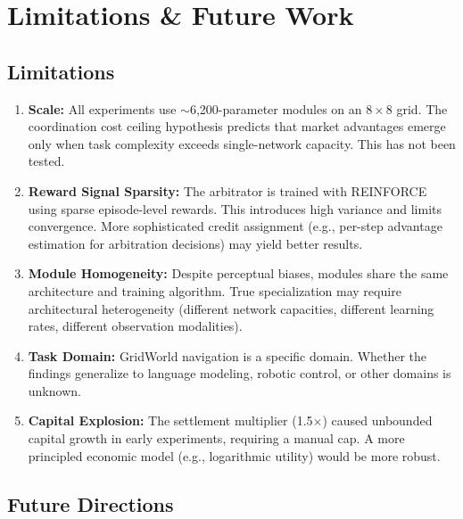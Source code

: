 \documentclass[a4paper,11pt]{article}
\begin{document}
\section{Limitations \& Future Work}

\subsection{Limitations}

\begin{enumerate}[itemsep=2pt]
    \item \textbf{Scale:} All experiments use $\sim$6,200-parameter modules on an $8\times8$ grid. The coordination cost ceiling hypothesis predicts that market advantages emerge only when task complexity exceeds single-network capacity. This has not been tested.
    \item \textbf{Reward Signal Sparsity:} The arbitrator is trained with REINFORCE using sparse episode-level rewards. This introduces high variance and limits convergence. More sophisticated credit assignment (e.g., per-step advantage estimation for arbitration decisions) may yield better results.
    \item \textbf{Module Homogeneity:} Despite perceptual biases, modules share the same architecture and training algorithm. True specialization may require architectural heterogeneity (different network capacities, different learning rates, different observation modalities).
    \item \textbf{Task Domain:} GridWorld navigation is a specific domain. Whether the findings generalize to language modeling, robotic control, or other domains is unknown.
    \item \textbf{Capital Explosion:} The settlement multiplier (1.5$\times$) caused unbounded capital growth in early experiments, requiring a manual cap. A more principled economic model (e.g., logarithmic utility) would be more robust.
\end{enumerate}

\subsection{Future Directions}
\end{document}
